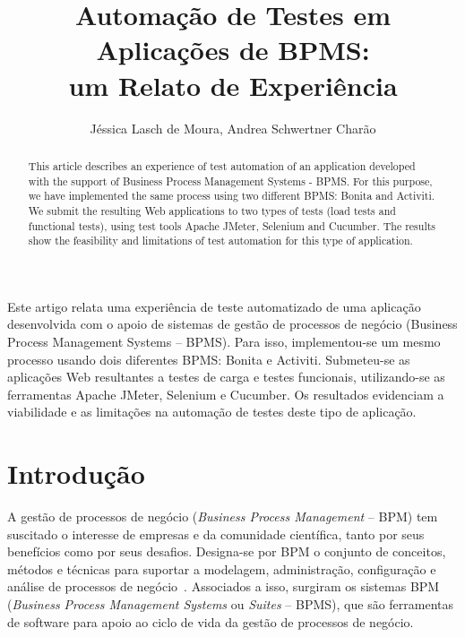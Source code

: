 \documentclass[12pt]{article}
\title{Automação de Testes em Aplicações de BPMS:\\ um Relato de Experiência}
\author{Jéssica Lasch de Moura\inst{1},
Andrea Schwertner Charão\inst{1}}
\begin{document}
\maketitle

\begin{resumo}
Este artigo relata uma experiência de teste automatizado de uma aplicação desenvolvida com o apoio de sistemas de gestão de processos de negócio (Business Process Management Systems -- BPMS). Para isso, implementou-se um mesmo processo usando dois diferentes BPMS: Bonita e Activiti. Submeteu-se as aplicações Web resultantes a testes de carga e testes funcionais, utilizando-se as ferramentas Apache JMeter, Selenium e Cucumber. Os resultados evidenciam a viabilidade e as limitações na automação de testes deste tipo de aplicação.
\end{resumo}

\begin{abstract}

This article describes an experience of test automation of an application developed with the support of Business Process Management Systems - BPMS. For this purpose, we have implemented the same process using two different BPMS: Bonita and Activiti. We submit the resulting Web applications to two types of tests (load tests and functional tests), using test tools Apache JMeter, Selenium and Cucumber. The results show the feasibility and limitations of test automation for this type of application.
\end{abstract}

\section{Introdução}

A gestão de processos de negócio (\emph{Business Process Management} -- BPM) tem suscitado o interesse de empresas e da comunidade científica, tanto por seus benefícios como por seus desafios. Designa-se por BPM o conjunto de conceitos, métodos e técnicas para suportar a modelagem, administração, configuração e análise de processos de negócio~\cite{weske, aalst2013survey}. Associados a isso, surgiram os sistemas BPM (\emph{Business Process Management Systems} ou \emph{Suites} -- BPMS), que são ferramentas de software para apoio ao ciclo de vida da gestão de processos de negócio. 
\end{document}
